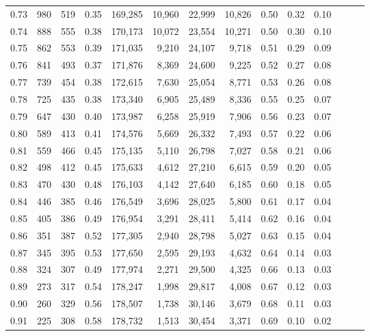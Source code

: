 \begin{tabular}{rrrrrrrrrrrrrr}
0.73 &    980 &    519 &  0.35 &  169,285 &   10,960 &  22,999 &  10,826 &  0.50 &  0.32 &      0.10 \\
0.74 &    888 &    555 &  0.38 &  170,173 &   10,072 &  23,554 &  10,271 &  0.50 &  0.30 &      0.10 \\
0.75 &    862 &    553 &  0.39 &  171,035 &    9,210 &  24,107 &   9,718 &  0.51 &  0.29 &      0.09 \\
0.76 &    841 &    493 &  0.37 &  171,876 &    8,369 &  24,600 &   9,225 &  0.52 &  0.27 &      0.08 \\
0.77 &    739 &    454 &  0.38 &  172,615 &    7,630 &  25,054 &   8,771 &  0.53 &  0.26 &      0.08 \\
0.78 &    725 &    435 &  0.38 &  173,340 &    6,905 &  25,489 &   8,336 &  0.55 &  0.25 &      0.07 \\
0.79 &    647 &    430 &  0.40 &  173,987 &    6,258 &  25,919 &   7,906 &  0.56 &  0.23 &      0.07 \\
0.80 &    589 &    413 &  0.41 &  174,576 &    5,669 &  26,332 &   7,493 &  0.57 &  0.22 &      0.06 \\
0.81 &    559 &    466 &  0.45 &  175,135 &    5,110 &  26,798 &   7,027 &  0.58 &  0.21 &      0.06 \\
0.82 &    498 &    412 &  0.45 &  175,633 &    4,612 &  27,210 &   6,615 &  0.59 &  0.20 &      0.05 \\
0.83 &    470 &    430 &  0.48 &  176,103 &    4,142 &  27,640 &   6,185 &  0.60 &  0.18 &      0.05 \\
0.84 &    446 &    385 &  0.46 &  176,549 &    3,696 &  28,025 &   5,800 &  0.61 &  0.17 &      0.04 \\
0.85 &    405 &    386 &  0.49 &  176,954 &    3,291 &  28,411 &   5,414 &  0.62 &  0.16 &      0.04 \\
0.86 &    351 &    387 &  0.52 &  177,305 &    2,940 &  28,798 &   5,027 &  0.63 &  0.15 &      0.04 \\
0.87 &    345 &    395 &  0.53 &  177,650 &    2,595 &  29,193 &   4,632 &  0.64 &  0.14 &      0.03 \\
0.88 &    324 &    307 &  0.49 &  177,974 &    2,271 &  29,500 &   4,325 &  0.66 &  0.13 &      0.03 \\
0.89 &    273 &    317 &  0.54 &  178,247 &    1,998 &  29,817 &   4,008 &  0.67 &  0.12 &      0.03 \\
0.90 &    260 &    329 &  0.56 &  178,507 &    1,738 &  30,146 &   3,679 &  0.68 &  0.11 &      0.03 \\
0.91 &    225 &    308 &  0.58 &  178,732 &    1,513 &  30,454 &   3,371 &  0.69 &  0.10 &      0.02 \\

\end{tabular}
